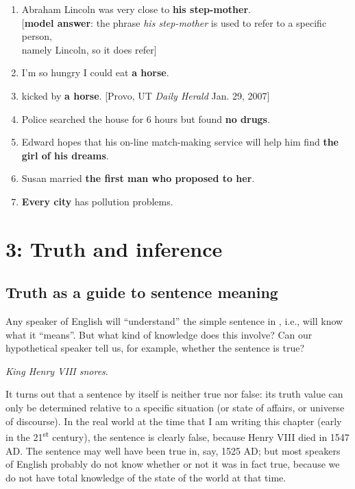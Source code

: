 \begin{enumerate}[label=\alph*.]
\item Abraham Lincoln was very close to \textbf{his step-mother}.\\{}
  {}[\textbf{model answer}: the phrase \textit{his step-mother} is used to refer to a specific person,\\
  namely  Lincoln, so it does refer]
\item  I’m so hungry I could eat \textbf{a horse}.
\item  {} kicked by \textbf{a horse}. [Provo, UT \textit{Daily Herald} Jan. 29, 2007]
\item  Police searched the house for 6 hours but found \textbf{no drugs}.
\item  Edward hopes that his on-line match-making service will help him find   \textbf{the girl of his dreams}.
\item  Susan married \textbf{the first man who proposed to her}.
\item  \textbf{Every city} has pollution problems.
\end{enumerate}


\chapter{{3}: Truth and inference}

\section{Truth as a guide to sentence meaning}\label{sec:} %

Any speaker of English will “understand” the simple sentence in , i.e., will know what it “means”. But what kind of knowledge does this involve? Can our hypothetical speaker tell us, for example, whether the sentence is true?


\ea \label{ex:3.1}
\textit{King Henry VIII snores}.
\z


It turns out that a sentence by itself is neither true nor false: its truth value can only be determined relative to a specific situation (or state of affairs, or universe of discourse). In the real world at the time that I am writing this chapter (early in the 21\textsuperscript{st} century), the sentence is clearly false, because Henry VIII died in 1547 AD. The sentence may well have been true in, say, 1525 AD; but most speakers of English probably do not know whether or not it was in fact true, because we do not have total knowledge of the state of the world at that time.



